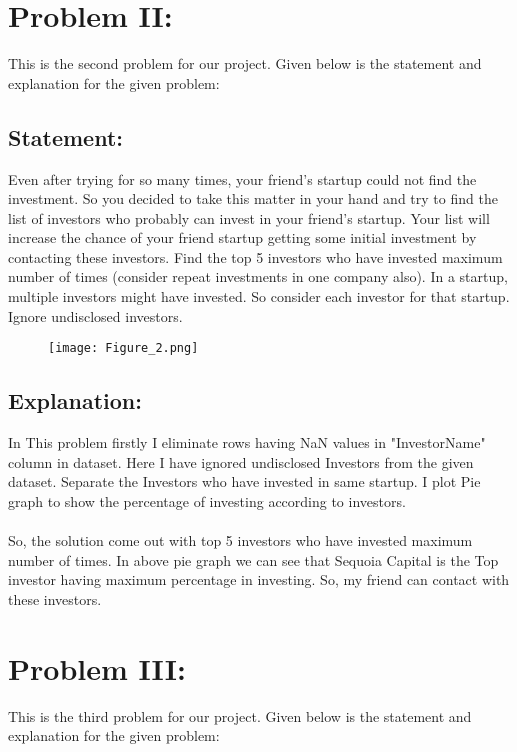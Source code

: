 \documentclass[12pt,a4paper]{article}
\begin{document}
\section{Problem II:}
This is the second problem for our project. Given below is the statement and explanation for the given problem:
\subsection{Statement:}
Even after trying for so many times, your friend’s startup could not find the investment. So you decided to take this matter in your hand and try to find the list of investors who probably can invest in your friend’s startup. Your list will increase the chance of your friend startup getting some initial investment by contacting these investors. Find the top 5 investors who have invested maximum number of times (consider repeat investments in one company also). In a startup, multiple investors might have invested. So consider each investor for that startup. Ignore undisclosed investors.
\begin{figure}[!ht]
	\begin{center}
			\texttt{[image: Figure\_2.png]}
	\end{center}
\end{figure}
\clearpage
\subsection{Explanation:}
In This problem firstly I eliminate rows having NaN values in "InvestorName" column in dataset. Here I have ignored undisclosed Investors from the given dataset. Separate the Investors who have invested in same startup. I plot
Pie graph to show the percentage of investing according to investors.\\
\\So, the solution come out with top 5 investors who have invested maximum number of times. In above pie graph we can see that Sequoia Capital is the Top investor having maximum percentage in investing. So, my friend can contact with these investors.
\section{Problem III:}
This is the third problem for our project. Given below is the statement and explanation for the given problem:
\end{document}
